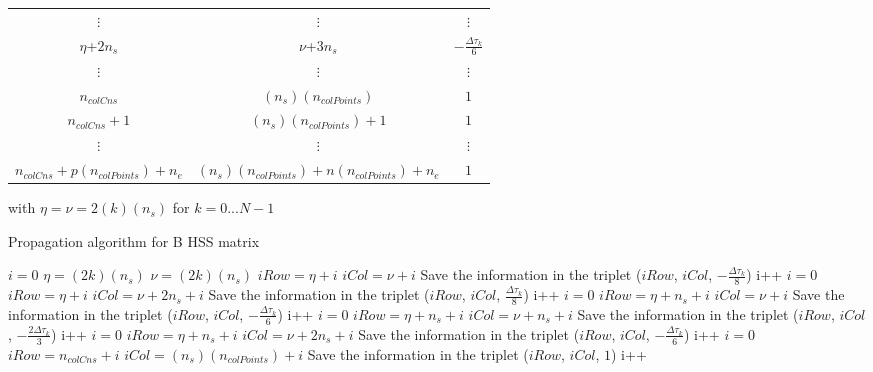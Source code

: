 \documentclass[12pt]{article}
\begin{document}
\begin{table}[h]
\begin{center}
\begin{tabular}{c|c|c}
$\vdots$ & $\vdots$   &    $\vdots$     \\
$\eta$+$2n_s$ & $\nu$+$3n_s$        & $-\frac{\Delta \tau_k}{6}$    \\
 $\vdots$ & $\vdots$     &    $\vdots$     \\
$n_{colCns}$      & $(n_s)(n_{colPoints})$             & $1$    \\
$n_{colCns}+1$      & $(n_s)(n_{colPoints})+1$             & $1$    \\
$\vdots$ & $\vdots$   &    $\vdots$     \\
$n_{colCns}+p(n_{colPoints})+n_e$      & $(n_s)(n_{colPoints})+n(n_{colPoints})+n_e$             & $1$    \\
\end{tabular}
\end{center}
\end{table}

\noindent with $\eta=\nu=2(k)(n_s)$ for $k=0...N-1$

\begin{algorithm}
	\caption{Propagation algorithm for B HSS matrix} 
	\begin{algorithmic}[1]
		    \State $i=0$
		    \State $\eta=(2k)(n_s)$
		    \State $\nu=(2k)(n_s)$
			    \State $iRow=\eta+i$
			    \State $iCol=\nu+i$
				\State Save the information in the triplet ($iRow$, $iCol$, $-\frac{\Delta \tau_k}{8} $)
				\State i++
			\EndFor
			\State $i=0$
			    \State $iRow=\eta+i$
			    \State $iCol=\nu+2n_s+i$
				\State Save the information in the triplet ($iRow$, $iCol$, $\frac{\Delta \tau_k}{8} $)
				\State i++
			\EndFor
			\State $i=0$
			    \State $iRow=\eta+n_s+i$
			    \State $iCol=\nu+i$
				\State Save the information in the triplet ($iRow$, $iCol$, $-\frac{\Delta \tau_k}{6} $)
				\State i++
			\EndFor
			\State $i=0$
			    \State $iRow=\eta+n_s+i$
			    \State $iCol=\nu+n_s+i$
				\State Save the information in the triplet ($iRow$, $iCol$, $-\frac{2\Delta \tau_k}{3} $)
				\State i++
			\EndFor
			\State $i=0$
			    \State $iRow=\eta+n_s+i$
			    \State $iCol=\nu+2n_s+i$
				\State Save the information in the triplet ($iRow$, $iCol$, $-\frac{\Delta \tau_k}{6} $)
				\State i++
			\EndFor
		\EndFor
		\State $i=0$
		        \State $iRow=n_{colCns}+i$
			    \State $iCol=(n_s)(n_{colPoints})+i$
				\State Save the information in the triplet ($iRow$, $iCol$, $1$)
				\State i++
		\EndFor
		
	\end{algorithmic} 
\end{algorithm}
\end{document}
